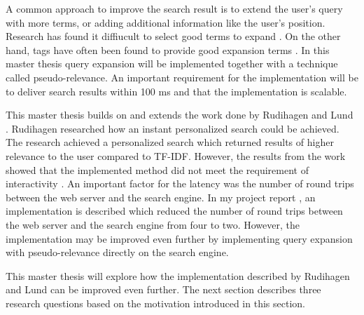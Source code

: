 A common approach to improve the search result is to extend the user's query with more terms,
or adding additional information like the user's position.
Research has found it diffiucult to select good terms to expand \cite{pseudo-relevance-invalid}.
On the other hand, tags have often been found to provide good expansion terms \cite{ir-hashtag}.
In this master thesis query expansion will be implemented together with a technique called pseudo-relevance.
An important requirement for the implementation will be to deliver search results within 100 ms and that the implementation is scalable.

This master thesis builds on and extends the work done by Rudihagen \cite{master-thesis} and Lund \cite{project-report}.
Rudihagen researched how an instant personalized search could be achieved.
The research achieved a personalized search which returned results of higher relevance to the user compared to TF-IDF.
However, the results from the work showed that the implemented method did not meet the requirement of interactivity \cite{master-thesis}.
An important factor for the latency was the number of round trips between the web server and the search engine.
In my project report \cite{project-report}, an implementation is described which reduced the number of round trips between the web server and the search engine from four to two.
However, the implementation may be improved even further by implementing query expansion with pseudo-relevance directly on the search engine.

This master thesis will explore how the implementation described by Rudihagen and Lund can be improved even further.
The next section describes three research questions based on the motivation introduced in this section.
